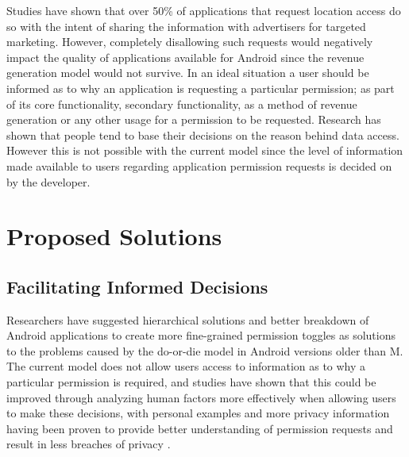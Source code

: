 Studies have shown that over 50\% of applications that request location access do so with the intent of sharing the information with advertisers for targeted marketing\cite{saint201050}. However, completely disallowing such requests would negatively impact the quality of applications available for Android since the revenue generation model would not survive. \cite{aa} In an ideal situation a user should be informed as to why an application is requesting a particular permission; as part of its core functionality, secondary functionality, as a method of revenue generation or any other usage for a permission to be requested. Research has shown that people tend to base their decisions on the reason behind data access\cite{lin2014modeling}. However this is not possible with the current model since the level of information made available to users regarding application permission requests is decided on by the developer.

\section{Proposed Solutions}
\subsection{Facilitating Informed Decisions}
Researchers have suggested hierarchical solutions\cite{barrera2010methodology} and better breakdown of Android applications to create more fine-grained permission toggles\cite{bugiel2013flexible} as solutions to the problems caused by the do-or-die model in Android versions older than M. The current model does not allow users access to information as to why a particular permission is required, and studies have shown that this could be improved through analyzing human factors more effectively when allowing users to make these decisions, with personal examples and more privacy information having been proven to provide better understanding of permission requests and result in less breaches of privacy\cite{kelley2013privacy} \cite{harbach2014using}.  

